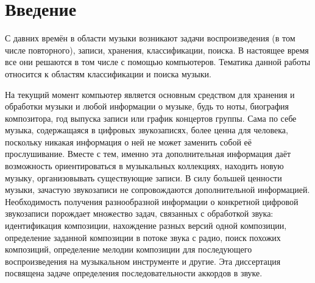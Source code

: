 \chapter*{Введение}							%


С давних времён в области музыки возникают задачи воспроизведения (в том числе
повторного), записи, хранения, классификации, поиска. В настоящее время все они
решаются в том числе с помощью компьютеров. Тематика данной работы относится к
областям классификации и поиска музыки.

На текущий момент компьютер является основным средством для хранения и обработки
музыки и любой информации о музыке, будь то ноты, биография композитора, год
выпуска записи или график концертов группы. Сама по себе музыка, содержащаяся в
цифровых звукозаписях, более ценна для человека, поскольку никакая
информация о ней не может заменить собой её прослушивание. Вместе с тем, именно
эта дополнительная информация даёт возможность ориентироваться в музыкальных
коллекциях, находить новую музыку, организовывать существующие записи. В силу
большей ценности музыки, зачастую звукозаписи не сопровождаются дополнительной
информацией. Необходимость получения разнообразной информации о конкретной
цифровой звукозаписи порождает множество задач, связанных с обработкой звука:
идентификация композиции, нахождение разных версий одной композиции, определение
заданной композиции в потоке звука с радио, поиск похожих композиций,
определение мелодии композиции для последующего воспроизведения на музыкальном
инструменте и другие. Эта диссертация посвящена задаче определения
последовательности аккордов в звуке.

